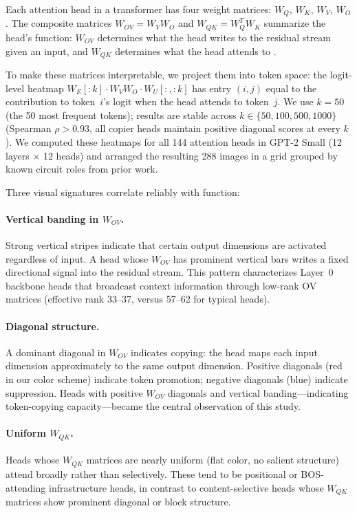\documentclass{article}
\begin{document}
Each attention head in a transformer has four weight matrices: $W_Q$,
$W_K$, $W_V$, $W_O$. The composite matrices $W_{OV} = W_V W_O$ and
$W_{QK} = W_Q^T W_K$ summarize the head's function: $W_{OV}$
determines what the head writes to the residual stream given an input,
and $W_{QK}$ determines what the head attends to
\citep{elhage2021mathematical}.

To make these matrices interpretable, we project them into token space:
the logit-level heatmap $W_E[:k] \cdot W_V W_O \cdot W_U[:, :k]$ has
entry $(i, j)$ equal to the contribution to token~$i$'s logit when the
head attends to token~$j$. We use $k = 50$ (the 50 most frequent
tokens); results are stable across
$k \in \{50, 100, 500, 1000\}$ (Spearman $\rho > 0.93$, all copier
heads maintain positive diagonal scores at every $k$).
We computed these heatmaps for all 144 attention heads in GPT-2
Small (12 layers $\times$ 12 heads) and arranged the resulting 288
images in a grid grouped by known circuit roles from prior work.

Three visual signatures correlate reliably with function:

\paragraph{Vertical banding in $W_{OV}$.}
Strong vertical stripes indicate that certain output dimensions are
activated regardless of input. A head whose $W_{OV}$ has prominent
vertical bars writes a fixed directional signal into the residual stream.
This pattern characterizes Layer~0 backbone heads that broadcast context
information through low-rank OV matrices (effective rank 33--37,
versus 57--62 for typical heads).

\paragraph{Diagonal structure.}
A dominant diagonal in $W_{OV}$ indicates copying: the head maps each
input dimension approximately to the same output dimension. Positive
diagonals (red in our color scheme) indicate token promotion; negative
diagonals (blue) indicate suppression. Heads with positive $W_{OV}$ diagonals and vertical banding---indicating
token-copying capacity---became the central observation of this study.

\paragraph{Uniform $W_{QK}$.}
Heads whose $W_{QK}$ matrices are nearly uniform (flat color, no
salient structure) attend broadly rather than selectively. These
tend to be positional or BOS-attending infrastructure heads, in
contrast to content-selective heads whose $W_{QK}$ matrices show
prominent diagonal or block structure.
\end{document}
